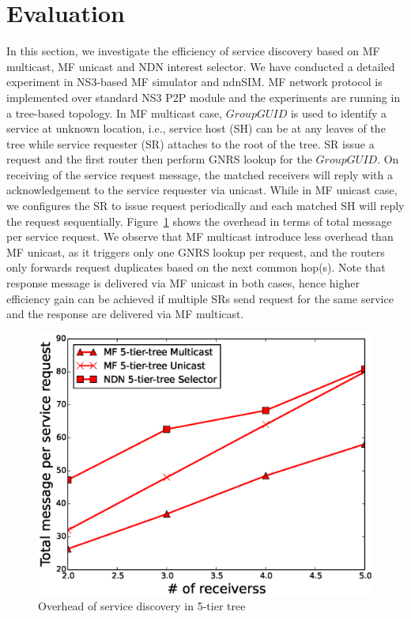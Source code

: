 \section{Evaluation}
In this section, we investigate the efficiency of service discovery based on MF multicast, MF unicast and NDN interest selector. We have conducted a detailed experiment in NS3-based MF simulator and ndnSIM.  MF network protocol is implemented over standard NS3 P2P module and the experiments are running in a tree-based topology. In MF multicast case, $Group GUID$ is used to identify a service at unknown location, i.e., service host (SH) can be at any leaves of the tree while service requester (SR) attaches to the root of the tree. SR issue a request and the first router then perform  GNRS lookup for the $Group GUID$. On receiving of the service request message, the matched receivers will reply with a acknowledgement to the service requester via unicast. While in MF unicast case, we configures the SR to issue request periodically and each matched SH will reply the request sequentially. Figure~\ref{fig:5_service_over} shows the overhead in terms of total message per service request. We observe that MF multicast introduce less overhead than MF unicast, as it triggers only one GNRS lookup per request, and the routers only forwards request duplicates based on the next common hop(s). Note that response message is delivered via MF unicast in both cases, hence higher efficiency gain can be achieved if multiple  SRs send request for the same service and the response are delivered via MF multicast. 
     
\begin{figure}
\includegraphics[width=\columnwidth]{figure/5_service_discovery_overhead.eps}
\caption{\label{fig:5_service_over}Overhead of service discovery in 5-tier tree}
\end{figure}

